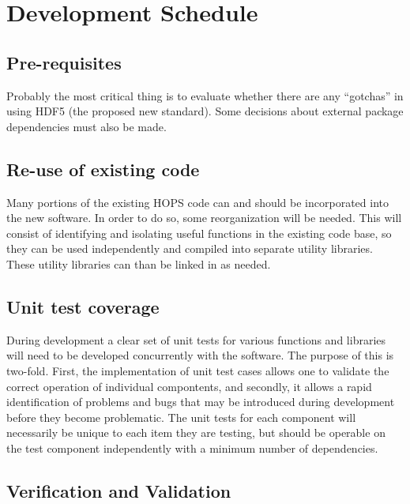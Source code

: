 %
%

\section{Development Schedule}
\label{sec:devsched}

\subsection{Pre-requisites}
\label{sec:prereq}
Probably the most critical thing is to evaluate whether there are any
``gotchas'' in using HDF5 (the proposed new standard).  Some decisions
about external package dependencies must also be made.

\subsection{Re-use of existing code}
\label{sec:reuse}

Many portions of the existing HOPS code can and should be incorporated into the new software. In order to do so, some reorganization will be needed. This will consist
of identifying and isolating useful functions in the existing code base, so they can be used independently and compiled into separate utility libraries. These utility
libraries can than be linked in as needed.

\subsection{Unit test coverage}
\label{sec:unitest}

During development a clear set of unit tests for various functions and libraries will need to be developed concurrently with the software. The purpose of this is two-fold. First, the
implementation of unit test cases allows one to validate the correct operation of individual compontents, and secondly, it allows a rapid identification of problems and bugs that may
be introduced during development before they become problematic. The unit tests for each component will necessarily be unique to each item they are testing, but should be operable
on the test component independently with a minimum number of dependencies.

\subsection{Verification and Validation}
\label{sec:vandv}

